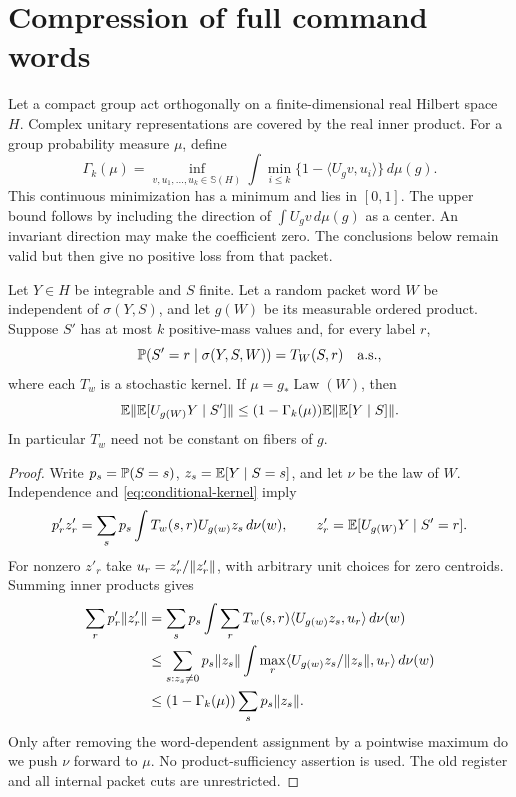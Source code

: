 \section{Compression of full command words}\label{sec:packets}
Let a compact group act orthogonally on a finite-dimensional real Hilbert
space $H$. Complex unitary representations are covered by the real inner
product. For a group probability measure $\mu$, define
\begin{equation}\label{eq:distortion}
 \Gamma_k(\mu)=\inf_{v,u_1,\ldots,u_k\in\mathbb S(H)}
 \int\min_{i\le k}\{1-\langle U_gv,u_i\rangle\}\,d\mu(g).
\end{equation}
This continuous minimization has a minimum and lies in $[0,1]$.
The upper bound follows by including the direction of
$\int U_gv\,d\mu(g)$ as a center. An invariant direction may make the
coefficient zero. The conclusions below remain valid but then give no
positive loss from that packet.

\begin{lemma}\label{lem:packet}
Let $Y\in H$ be integrable and $S$ finite. Let a random packet word $W$
be independent of $\sigma(Y,S)$, and let $g(W)$ be its measurable ordered
product. Suppose $S'$ has at most $k$ positive-mass values and, for every
label $r$,
\begin{equation}\label{eq:conditional-kernel}
 \mathbb P(S'=r\mid\sigma(Y,S,W))=T_W(S,r)\quad\hbox{a.s.},
\end{equation}
where each $T_w$ is a stochastic kernel. If $\mu=g_*\operatorname{Law}(W)$,
then
\begin{equation}\label{eq:packet}
 \mathbb E\lVert\mathbb E[U_{g(W)}Y\mid S']\rVert
 \le (1-\Gamma_k(\mu))\mathbb E\lVert\mathbb E[Y\mid S]\rVert.
\end{equation}
In particular $T_w$ need not be constant on fibers of $g$.
\end{lemma}
\begin{proof}
Write $p_s=\mathbb P(S=s)$, $z_s=\mathbb E[Y\mid S=s]$, and let $\nu$ be the law
of $W$. Independence and \eqref{eq:conditional-kernel} imply
\[
 p'_rz'_r=\sum_s p_s\int T_w(s,r)U_{g(w)}z_s\,d\nu(w),
 \qquad z'_r=\mathbb E[U_{g(W)}Y\mid S'=r].
\]
For nonzero $z'_r$ take $u_r=z'_r/\lVert z'_r\rVert$, with arbitrary unit
choices for zero centroids. Summing inner products gives
\begin{align*}
 \sum_rp'_r\lVert z'_r\rVert
 &=\sum_sp_s\int\sum_rT_w(s,r)\langle U_{g(w)}z_s,u_r\rangle\,d\nu(w)\\
 &\le\sum_{s:z_s\ne0}p_s\lVert z_s\rVert
       \int\max_r\langle U_{g(w)}z_s/\lVert z_s\rVert,u_r\rangle\,d\nu(w)\\
 &\le (1-\Gamma_k(\mu))\sum_sp_s\lVert z_s\rVert.
\end{align*}
Only after removing the word-dependent assignment by a pointwise maximum
do we push $\nu$ forward to $\mu$. No product-sufficiency assertion is
used. The old register and all internal packet cuts are unrestricted.
\end{proof}

